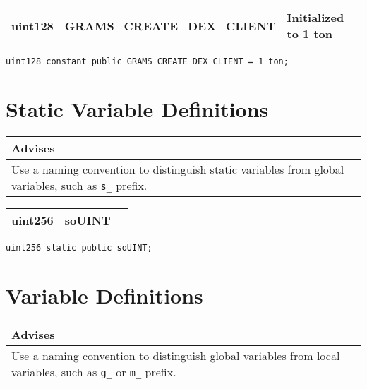 \ifsoltables
\noindent\begin{tabular}{|l|l|p{5cm}|}\hline
uint128 & GRAMS\_{}CREATE\_{}DEX\_{}CLIENT & Initialized to 1 ton \\\hline
\end{tabular}
\fi


\begin{lstlisting}[firstnumber=42]
	uint128 constant public GRAMS_CREATE_DEX_CLIENT = 1 ton;
\end{lstlisting}

\section{Static Variable Definitions}


\ifsoldraft
\noindent\begin{tabular}{|p{12cm}|}\hline
\rowcolor{green}Advises
\\\hline
Use a naming convention to distinguish static variables from global variables, such as \verb+s_+ prefix.
\\\hline\end{tabular}
\fi

\ifsoltables
\noindent\begin{tabular}{|l|l|p{5cm}|}\hline
uint256 & soUINT &  \\\hline
\end{tabular}
\fi


\begin{lstlisting}[firstnumber=13]
	uint256 static public soUINT;
\end{lstlisting}

\section{Variable Definitions}


\ifsoldraft
\noindent\begin{tabular}{|p{12cm}|}\hline
\rowcolor{green}Advises
\\\hline
Use a naming convention to distinguish global variables from local variables, such as \verb+g_+ or \verb+m_+ prefix.
\\\hline\end{tabular}
\fi


